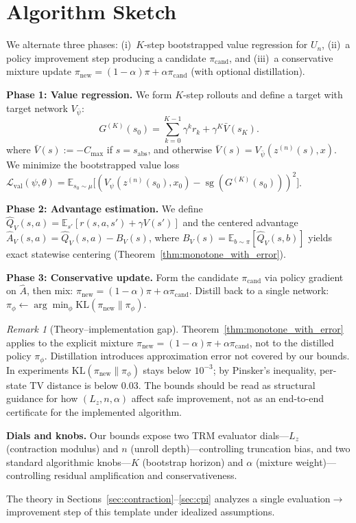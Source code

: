 \documentclass{article}
\theoremstyle{plain}
\theoremstyle{definition}
\theoremstyle{remark}
\newtheorem{remark}[theorem]{Remark}
\newcommand{\shortonly}[1]{#1}
\newcommand{\shortonly}[1]{}
\newcommand{\E}{\mathbb{E}}
\newcommand{\KL}{\mathrm{KL}}
\newcommand{\sg}{\operatorname{sg}}
\begin{document}
\shortonly{
\section{Algorithm Sketch}
\label{sec:algorithm}
We alternate three phases: (i)~$K$-step bootstrapped value regression for $U_n$, (ii)~a policy improvement step producing a candidate $\pi_{\mathrm{cand}}$, and (iii)~a conservative mixture update $\pi_{\mathrm{new}}\!=\!(1{-}\alpha)\pi+\alpha\pi_{\mathrm{cand}}$ (with optional distillation).

\textbf{Phase 1: Value regression.}
We form $K$-step rollouts and define a target with target network $V_{\bar\psi}$:
\begin{equation}
G^{(K)}(s_0)
=
\sum_{k=0}^{K-1}\gamma^k r_k
+
\gamma^K \bar V(s_K).
\label{eq:GK_def}
\end{equation}
where $\bar V(s):=-C_{\max}$ if $s=s_{\mathrm{abs}}$, and otherwise $\bar V(s)=V_{\bar\psi}(z^{(n)}(s),x)$.
We minimize the bootstrapped value loss
$\mathcal{L}_{\mathrm{val}}(\psi,\theta)
=
\E_{s_0\sim\mu}\bigl[
   (V_\psi(z^{(n)}(s_0),x_0)
   -
   \sg(G^{(K)}(s_0)))^2
\bigr]$.

\textbf{Phase 2: Advantage estimation.}
We define $\widehat Q_V(s,a) = \E_{s'}[r(s,a,s') + \gamma V(s')]$ and the centered advantage $\widehat A_V(s,a) = \widehat Q_V(s,a) - B_V(s)$, where $B_V(s)=\E_{b\sim\pi}[\widehat Q_V(s,b)]$ yields exact statewise centering (Theorem~\ref{thm:monotone_with_error}).

\textbf{Phase 3: Conservative update.}
Form the candidate $\pi_{\mathrm{cand}}$ via policy gradient on $\widehat A$, then mix:
$\pi_{\mathrm{new}}=(1-\alpha)\pi+\alpha\pi_{\mathrm{cand}}$.
Distill back to a single network: $\pi_\phi \gets \arg\min_\phi \KL(\pi_{\mathrm{new}} \| \pi_\phi)$.

\begin{remark}[Theory--implementation gap]
\label{rem:distillation_penalty}
Theorem~\ref{thm:monotone_with_error} applies to the explicit mixture $\pi_{\mathrm{new}}{=}(1{-}\alpha)\pi{+}\alpha\pi_{\mathrm{cand}}$, not to the distilled policy $\pi_\phi$.
Distillation introduces approximation error not covered by our bounds.
In experiments $\KL(\pi_{\mathrm{new}}\|\pi_\phi)$ stays below $10^{-3}$; by Pinsker's inequality, per-state TV distance is below $0.03$.
The bounds should be read as structural guidance for how $(L_z, n, \alpha)$ affect safe improvement, not as an end-to-end certificate for the implemented algorithm.
\end{remark}

\textbf{Dials and knobs.}
Our bounds expose two TRM evaluator dials---$L_z$ (contraction modulus) and $n$ (unroll depth)---controlling truncation bias, and two standard algorithmic knobs---$K$ (bootstrap horizon) and $\alpha$ (mixture weight)---controlling residual amplification and conservativeness.

The theory in Sections~\ref{sec:contraction}--\ref{sec:cpi} analyzes a single evaluation$\rightarrow$improvement step of this template under idealized assumptions.}
\end{document}
